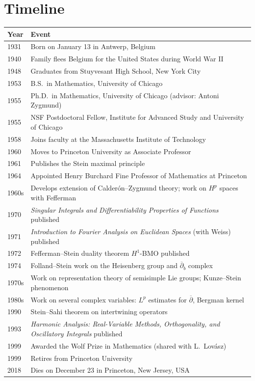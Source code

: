 \section*{Timeline}
\begin{tabularx}{\linewidth}{|p{1.5cm}|>{\raggedright\arraybackslash}X|}
\hline
\textbf{Year} & \textbf{Event} \\ \hline
1931 & Born on January 13 in Antwerp, Belgium \\ \hline
1940 & Family flees Belgium for the United States during World War II \\ \hline
1948 & Graduates from Stuyvesant High School, New York City \\ \hline
1953 & B.S.\ in Mathematics, University of Chicago \\ \hline
1955 & Ph.D.\ in Mathematics, University of Chicago (advisor: Antoni Zygmund) \\ \hline
1955 & NSF Postdoctoral Fellow, Institute for Advanced Study and University of Chicago \\ \hline
1958 & Joins faculty at the Massachusetts Institute of Technology \\ \hline
1960 & Moves to Princeton University as Associate Professor \\ \hline
1961 & Publishes the Stein maximal principle \\ \hline
1964 & Appointed Henry Burchard Fine Professor of Mathematics at Princeton \\ \hline
1960s & Develops extension of Calder\'on--Zygmund theory; work on \(H^p\) spaces with Fefferman \\ \hline
1970 & \textit{Singular Integrals and Differentiability Properties of Functions} published \\ \hline
1971 & \textit{Introduction to Fourier Analysis on Euclidean Spaces} (with Weiss) published \\ \hline
1972 & Fefferman--Stein duality theorem \(H^1\)-BMO published \\ \hline
1974 & Folland--Stein work on the Heisenberg group and \(\overline{\partial}_b\) complex \\ \hline
1970s & Work on representation theory of semisimple Lie groups; Kunze--Stein phenomenon \\ \hline
1980s & Work on several complex variables: \(L^p\) estimates for \(\overline{\partial}\), Bergman kernel \\ \hline
1990 & Stein--Sahi theorem on intertwining operators \\ \hline
1993 & \textit{Harmonic Analysis: Real-Variable Methods, Orthogonality, and Oscillatory Integrals} published \\ \hline
1999 & Awarded the Wolf Prize in Mathematics (shared with L.\ Lov\'asz) \\ \hline
1999 & Retires from Princeton University \\ \hline
2018 & Dies on December 23 in Princeton, New Jersey, USA \\ \hline
\end{tabularx}

